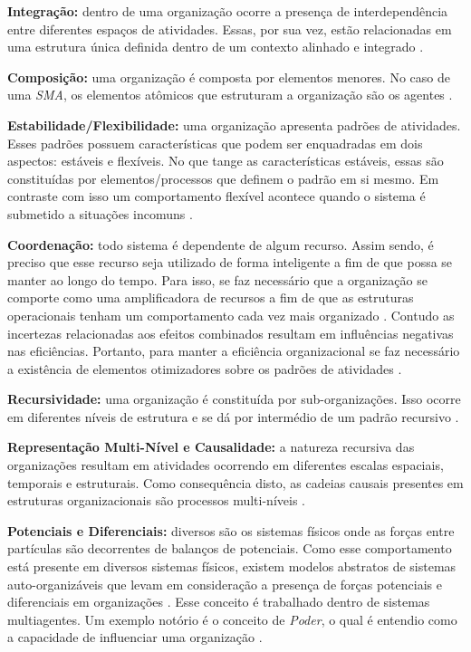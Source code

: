 \textbf{Integração:} dentro de uma organização ocorre a presença de interdependência entre diferentes espaços de atividades. Essas, por sua vez, estão relacionadas em uma estrutura única definida dentro de um contexto alinhado e integrado \cite{organiationofmultiagentsystem}.

\textbf{Composição:} uma organização é composta por elementos menores. No caso de uma \textit{SMA}, os elementos atômicos que estruturam a organização são os agentes \cite{organiationofmultiagentsystem}.

\textbf{Estabilidade/Flexibilidade:} uma organização apresenta padrões de atividades. Esses padrões possuem características que podem ser enquadradas em dois aspectos: estáveis e flexíveis. No que tange as características estáveis, essas são constituídas por elementos/processos que definem o padrão em si mesmo. Em contraste com isso um comportamento flexível acontece quando o sistema é submetido a situações incomuns \cite{organiationofmultiagentsystem}.

\textbf{Coordenação:} todo sistema é dependente de algum recurso. Assim sendo, é preciso que esse recurso seja utilizado de forma inteligente a fim de que possa se manter ao longo do tempo. Para isso, se faz necessário que a organização se comporte como uma amplificadora de recursos a fim de que as estruturas operacionais tenham um comportamento cada vez mais organizado \cite{selforganization, selforganizatioenvoriment, defintionselforganization}. Contudo as incertezas relacionadas aos efeitos combinados resultam em influências negativas nas eficiências. Portanto, para manter a eficiência organizacional se faz necessário a existência de elementos otimizadores sobre os padrões de atividades \cite{organiationofmultiagentsystem}.

\textbf{Recursividade:} uma organização é constituída por sub-organizações. Isso ocorre em diferentes níveis de estrutura e se dá por intermédio de um padrão recursivo \cite{organiationofmultiagentsystem}.

\textbf{Representação Multi-Nível e Causalidade:} a natureza recursiva das organizações resultam em atividades ocorrendo em diferentes escalas espaciais, temporais e estruturais. Como consequência disto, as cadeias causais presentes em estruturas organizacionais são processos multi-níveis \cite{organiationofmultiagentsystem}.

\textbf{Potenciais e Diferenciais:} diversos são os sistemas físicos onde as forças entre partículas são decorrentes de balanços de potenciais. Como esse comportamento está presente em diversos sistemas físicos, existem modelos abstratos de sistemas auto-organizáveis que levam em consideração a presença de forças potenciais e diferenciais em organizações \cite{selforganizationdiffforce}. Esse conceito é trabalhado dentro de sistemas multiagentes. Um exemplo notório é o conceito de \textit{Poder}, o qual é entendio como a capacidade de influenciar uma organização \cite{organiationofmultiagentsystem}.

